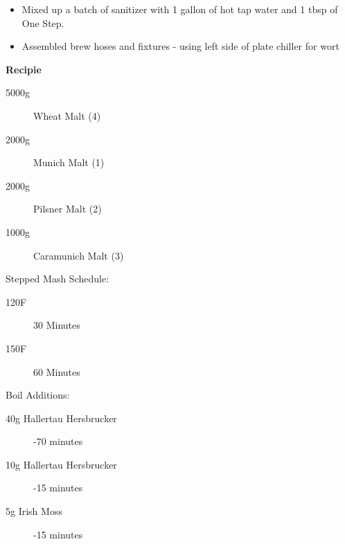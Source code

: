 \def\todaysdate{20220618}
\newday{\todaysdate}\label{\todaysdate}


\begin{itemize}
    \item Mixed up a batch of sanitizer with 1 gallon of hot tap water and 1 tbsp of One Step.
    \item Assembled brew hoses and fixtures - using left side of plate chiller for wort
\end{itemize}

\textbf{Recipie}
\begin{description}
    \item[5000g] Wheat Malt (4)
    \item[2000g] Munich Malt (1)
    \item[2000g] Pilsner Malt (2)
    \item[1000g] Caramunich Malt (3)
\end{description}

Stepped Mash Schedule:
\begin{description}
    \item[120F] 30 Minutes
    \item[150F] 60 Minutes
\end{description}

Boil Additions:
\begin{description}
    \item [40g Hallertau Hersbrucker] -70 minutes
    \item [10g Hallertau Hersbrucker] -15 minutes
    \item [5g Irish Moss] -15 minutes
\end{description}

